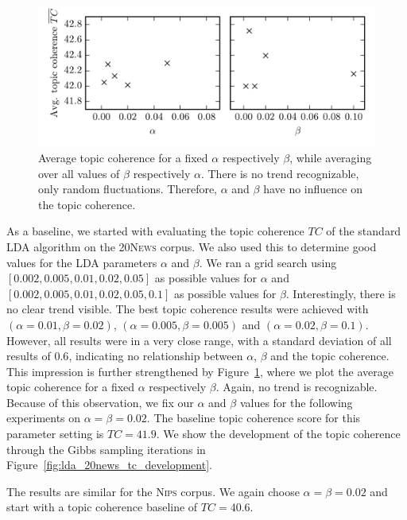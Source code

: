 \documentclass[
        a4paper,
        titlepage,
        twoside,
        parskip,
        numbers=noenddot
        ]{scrbook}
\theoremstyle{break}
\begin{document}
\begin{figure}
       \centering
       \includegraphics[width=12cm]{figures/standard_lda_alpha_beta.png}
       \caption{Average topic coherence for a fixed $\alpha$ respectively $\beta$, while averaging over all values of $\beta$ respectively $\alpha$. There is no trend recognizable, only random fluctuations. Therefore, $\alpha$ and $\beta$ have no influence on the topic coherence.}
       \label{fig:standard_lda_alpha_beta}
\end{figure}
As a baseline, we started with evaluating the topic coherence $TC$ of the standard LDA algorithm on the \textsc{20News} corpus.
We also used this to determine good values for the LDA parameters $\alpha$ and $\beta$.
We ran a grid search using $[0.002, 0.005, 0.01, 0.02, 0.05]$ as possible values for $\alpha$ and $[0.002, 0.005, 0.01, 0.02, 0.05, 0.1]$ as possible values for $\beta$.
Interestingly, there is no clear trend visible.
The best topic coherence results were achieved with $(\alpha=0.01,\beta=0.02)$, $(\alpha=0.005,\beta=0.005)$ and $(\alpha=0.02,\beta=0.1)$.
However, all results were in a very close range, with a standard deviation of all results of $0.6$, indicating no relationship between $\alpha$, $\beta$ and the topic coherence.
This impression is further strengthened by Figure~\ref{fig:standard_lda_alpha_beta}, where we plot the average topic coherence for a fixed $\alpha$ respectively $\beta$.
Again, no trend is recognizable.
Because of this observation, we fix our $\alpha$ and $\beta$ values for the following experiments on $\alpha = \beta = 0.02$.
The baseline topic coherence score for this parameter setting is $TC = 41.9$.
We show the development of the topic coherence through the Gibbs sampling iterations in Figure~\ref{fig:lda_20news_tc_development}.

The results are similar for the \textsc{Nips} corpus.
We again choose $\alpha = \beta = 0.02$ and start with a topic coherence baseline of $TC = 40.6$.
\end{document}
